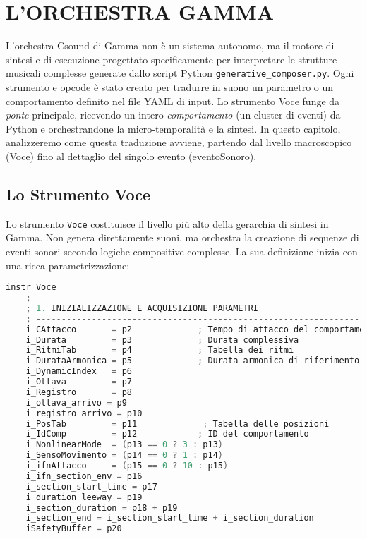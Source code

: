 
\section{L'ORCHESTRA GAMMA}
L'orchestra Csound di Gamma non è un sistema autonomo, ma il motore di sintesi e di esecuzione progettato specificamente per interpretare le strutture musicali complesse generate dallo script Python \texttt{generative\_composer.py}. Ogni strumento e opcode è stato creato per tradurre in suono un parametro o un comportamento definito nel file YAML di input. Lo strumento Voce funge da \textit{ponte} principale, ricevendo un intero \textit{comportamento} (un cluster di eventi) da Python e orchestrandone la micro-temporalità e la sintesi. In questo capitolo, analizzeremo come questa traduzione avviene, partendo dal livello macroscopico (Voce) fino al dettaglio del singolo evento (eventoSonoro).
\subsection{Lo Strumento Voce}
Lo strumento \texttt{Voce} costituisce il livello più alto della gerarchia di sintesi in Gamma. Non genera direttamente suoni, ma orchestra la creazione di sequenze di eventi sonori secondo logiche compositive complesse. La sua definizione inizia con una ricca parametrizzazione:

\begin{lstlisting}[language=C]
instr Voce
    ; -----------------------------------------------------------------------
    ; 1. INIZIALIZZAZIONE E ACQUISIZIONE PARAMETRI
    ; -----------------------------------------------------------------------
    i_CAttacco       = p2             ; Tempo di attacco del comportamento
    i_Durata         = p3             ; Durata complessiva
    i_RitmiTab       = p4             ; Tabella dei ritmi
    i_DurataArmonica = p5             ; Durata armonica di riferimento
    i_DynamicIndex   = p6         
    i_Ottava         = p7             
    i_Registro       = p8             
    i_ottava_arrivo = p9
    i_registro_arrivo = p10
    i_PosTab         = p11             ; Tabella delle posizioni
    i_IdComp         = p12            ; ID del comportamento
    i_NonlinearMode  = (p13 == 0 ? 3 : p13)
    i_SensoMovimento = (p14 == 0 ? 1 : p14) 
    i_ifnAttacco     = (p15 == 0 ? 10 : p15)
    i_ifn_section_env = p16 
    i_section_start_time = p17
    i_duration_leeway = p19
    i_section_duration = p18 + p19
    i_section_end = i_section_start_time + i_section_duration
    iSafetyBuffer = p20
\end{lstlisting}

